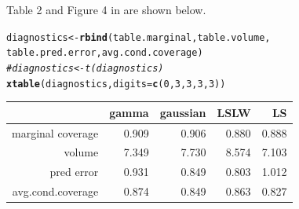 \documentclass[11pt]{article}\usepackage[]{graphicx}\usepackage[]{color}
\makeatletter
\newcommand{\hlnum}[1]{\textcolor[rgb]{0.686,0.059,0.569}{#1}}%
\newcommand{\hlcom}[1]{\textcolor[rgb]{0.678,0.584,0.686}{\textit{#1}}}%
\newcommand{\hlstd}[1]{\textcolor[rgb]{0.345,0.345,0.345}{#1}}%
\newcommand{\hlkwb}[1]{\textcolor[rgb]{0.69,0.353,0.396}{#1}}%
\newcommand{\hlkwc}[1]{\textcolor[rgb]{0.333,0.667,0.333}{#1}}%
\newcommand{\hlkwd}[1]{\textcolor[rgb]{0.737,0.353,0.396}{\textbf{#1}}}%
\newenvironment{kframe}{%
 \def\at@end@of@kframe{}%
 \ifinner\ifhmode%
  \def\at@end@of@kframe{\end{minipage}}%
  \begin{minipage}{\columnwidth}%
 \fi\fi%
 \def\FrameCommand##1{\hskip\@totalleftmargin \hskip-\fboxsep
 \colorbox{shadecolor}{##1}\hskip-\fboxsep
     \hskip-\linewidth \hskip-\@totalleftmargin \hskip\columnwidth}%
 \MakeFramed {\advance\hsize-\width
   \@totalleftmargin\z@ \linewidth\hsize
   \@setminipage}}%
 {\par\unskip\endMakeFramed%
 \at@end@of@kframe}
\makeatother
\begin{document}
Table 2 and Figure 4 in \citet{eck2019conformal} are shown below. 


\begin{kframe}
\begin{alltt}
\hlstd{diagnostics} \hlkwb{<-} \hlkwd{rbind}\hlstd{(table.marginal, table.volume,}
  \hlstd{table.pred.error, avg.cond.coverage)}
\hlcom{#diagnostics <- t(diagnostics)}
\hlkwd{xtable}\hlstd{(diagnostics,} \hlkwc{digits} \hlstd{=} \hlkwd{c}\hlstd{(}\hlnum{0}\hlstd{,} \hlnum{3}\hlstd{,} \hlnum{3}\hlstd{,} \hlnum{3}\hlstd{,} \hlnum{3}\hlstd{))}
\end{alltt}
\end{kframe}%
\begin{table}[ht]
\centering
\begin{tabular}{rrrrr}
  \hline
 & gamma & gaussian & LSLW & LS \\ 
  \hline
marginal coverage & 0.909 & 0.906 & 0.880 & 0.888 \\ 
  volume & 7.349 & 7.730 & 8.574 & 7.103 \\ 
  pred error & 0.931 & 0.849 & 0.803 & 1.012 \\ 
  avg.cond.coverage & 0.874 & 0.849 & 0.863 & 0.827 \\ 
   \hline
\end{tabular}
\end{table}
\end{document}
